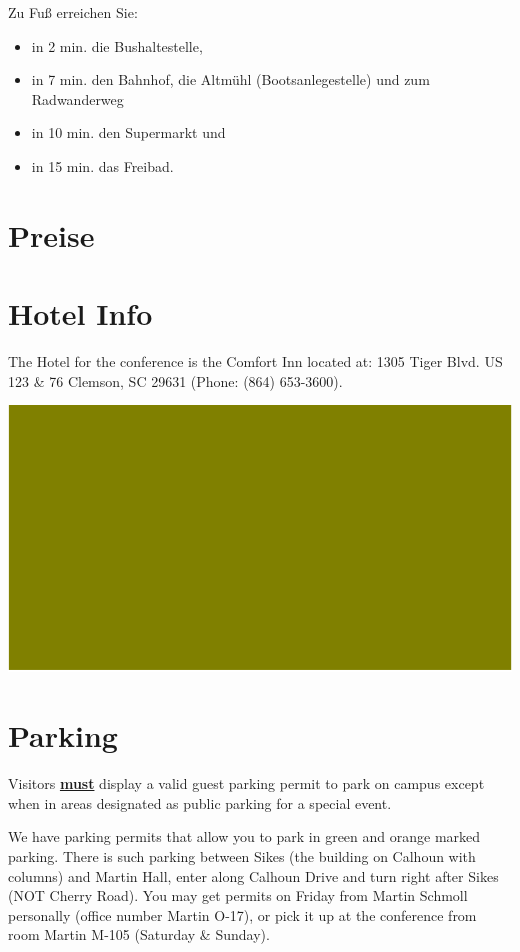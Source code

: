 \documentclass[10pt,foldmark,notumble]{leaflet}
\begin{document}
Zu Fuß erreichen Sie:

\begin{itemize}
\item in 2 min. die Bushaltestelle,
\item in 7 min. den Bahnhof, die Altmühl (Bootsanlegestelle) und zum Radwanderweg
\item in 10 min. den Supermarkt und
\item in 15 min. das Freibad.
\end{itemize}


\section{Preise}


\section{Hotel Info}
The Hotel for the conference is the Comfort Inn located at:
1305 Tiger Blvd.
US 123 \& 76
Clemson, SC 29631
(Phone: (864) 653-3600).

\includegraphics[scale=0.90]{hotel_map.eps}
\section{Parking}
Visitors \underline{\bf must} display a valid guest parking permit to
park on campus except when in areas designated as public parking for a
special event.


We have parking permits that allow you to park in green and orange
marked parking. There is such parking between Sikes (the building on
Calhoun with columns) and Martin Hall, enter along Calhoun Drive and
turn right after Sikes (NOT Cherry Road). You may get permits on Friday
from Martin Schmoll personally (office number Martin O-17), or pick it
up at the conference from room Martin M-105 (Saturday \& Sunday).
\end{document}
